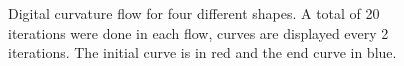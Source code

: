 \documentclass[runningheads]{llncs}
\begin{document}
\begin{figure}[!ht]
		\hspace{15pt}
		\hspace{15pt}
		\caption{Digital curvature flow for four different shapes. A total of 20 iterations were done in each flow, curves are displayed every 2 iterations. The initial curve is in red and the end curve in blue.}
		\label{fig:digital_flows}	
	\end{figure}
\end{document}
